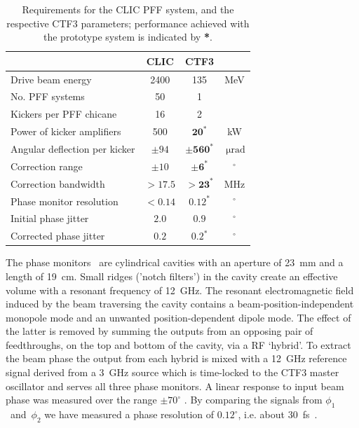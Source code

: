 \documentclass[%
 reprint,
 superscriptaddress,
 amsmath,
 amssymb,
 prl,
]{revtex4-1}
\begin{document}
\begin{table}
	\caption{\label{tab:pffspecs}
	    Requirements for the CLIC PFF system, and the respective CTF3 
	    parameters; performance achieved with the prototype system is indicated 
	    by \textbf{*}.}
\begin{ruledtabular}
	\begin{tabular}{lccc}
		 & CLIC & CTF3 \\
		\hline
		Drive beam energy & 2400 & 135 & MeV \\
		No. PFF systems & 50 & 1 & \\
		Kickers per PFF chicane & 16 & 2 & \\
		Power of kicker amplifiers & 500 & \(\mathbf{20^*}\) & kW \\
		Angular deflection per kicker & \(\pm94\) & 
		\(\mathbf{\pm560^*}\) & \(~\mathrm{\mu rad}\) \\
		Correction range & \(\pm 10\) & \(\mathbf{\pm 6^*}\) & \(^\circ\) \\
		Correction bandwidth & \(>17.5\) & \(\mathbf{>23^*}\) & MHz \\
		Phase monitor resolution & \(< 0.14\) & \(\mathbf{0.12^*}\) &  
		\(^\circ\)   \\
		Initial phase jitter & \(2.0\) & \(0.9\) &  \(^\circ\)  \\
		Corrected phase jitter & \(0.2\) & \(\mathbf{0.2^*}\) &  \(^\circ\)  \\
	\end{tabular}
\end{ruledtabular}
\end{table}


The phase monitors~\cite{phMonEuCard} are cylindrical cavities with an aperture 
of 23~mm and a length of 19~cm. Small ridges (’notch filters’) in the cavity 
create an effective volume with a resonant frequency of 12~GHz. 
The resonant electromagnetic field induced by the beam traversing the cavity 
contains a beam-position-independent monopole mode and an unwanted 
position-dependent dipole mode. The 
effect of the latter is removed by summing the outputs from an opposing pair 
of feedthroughs, on the top and bottom of the cavity, via a RF ‘hybrid’. 
To extract the beam phase the output from each hybrid 
is mixed with a 12~GHz reference signal derived from a 3~GHz source which is 
time-locked to the CTF3 master oscillator and serves all three phase monitors.
A linear response to input beam phase was measured over the range 
\(\pm70^\circ\) \cite{Skowron2013}. By comparing the signals from 
\(\phi_1\)~and~\(\phi_2\) we have measured a phase resolution of 
\(0.12^\circ\), i.e. about 30~fs~\cite{RobertsThesis}.
\end{document}
